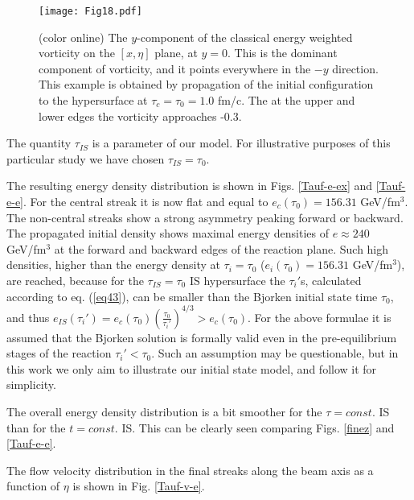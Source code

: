 \documentclass[aps,prc,twocolumn,floatfix,showpacs,a4paper,
nofootinbib,amsmath,amssymb]{revtex4-1}
\begin{document}
\begin{figure}[htb]     %
\begin{center}
\resizebox{1.01\columnwidth}{!}
{\texttt{[image: Fig18.pdf]}}
\caption{ (color online)
The $y$-component of the classical energy weighted vorticity
on the $[x,\eta]$ plane, at $y=0$. This is the dominant component of vorticity,
and it points everywhere in the $-y$ direction. This example is
obtained by propagation of the initial configuration to the
 hypersurface at $\tau_c = \tau_0 = 1.0$ fm/c. The at the upper
and lower edges the vorticity approaches -0.3.
}
\label{vort-ew_y}
\end{center}
\end{figure}        %

The quantity $\tau_{IS}$ is a parameter of our model. For illustrative purposes of this particular study we have chosen $\tau_{IS}=\tau_0$.

The resulting energy density distribution is shown in Figs. \ref{Tauf-e-ex} and \ref{Tauf-e-e}.
For the central streak it is now flat and equal to $e_c(\tau_0) = 156.31$ GeV/fm$^3$. The non-central streaks show a strong asymmetry peaking forward or backward. 
The propagated initial density shows maximal
energy densities of $e \approx 240$ GeV/fm$^3$ at the 
forward and backward edges of the reaction plane. Such high densities, 
higher than the energy density at $\tau_i=\tau_0$ ($e_i(\tau_0) = 156.31$ GeV/fm$^3$), are reached, because for 
the $\tau_{IS}=\tau_0$ IS hypersurface the $\tau_i '$s, calculated according to eq. (\ref{eq43}), can be smaller than the Bjorken initial state time $\tau_0$, and thus $e_{IS}(\tau_i ') = e_c(\tau_0) \left( \frac{\tau_0} {\tau_i '}\right)^{\!\!4/3} > e_c(\tau_0)$. For the above formulae it is assumed that the Bjorken solution is formally valid even in the pre-equilibrium stages of the reaction $\tau_i '<\tau_0$. Such an assumption may be questionable, but in this work we only aim to illustrate our initial state model, and follow it for simplicity. 
 
The overall energy density distribution is a bit smoother for the 
$\tau=const.$ IS than for the $t=const.$ IS.
This can be clearly seen comparing Figs. \ref{finez} and   \ref{Tauf-e-e}.

The flow velocity distribution in the final streaks along the beam axis as a function of $\eta$ is shown in Fig. \ref{Tauf-v-e}.
\end{document}
